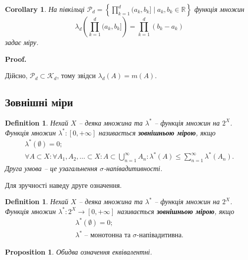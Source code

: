 \documentclass[a4paper, 10pt]{article}
\makeatletter
\theoremstyle{theoremdd}
\newtheorem{definition}[theorem]{Definition}
\newtheorem{proposition}[theorem]{Proposition}
\newtheorem{corollary}[theorem]{Corollary}
\renewenvironment{proof}[1][Proof.\\]{\par
\pushQED{\hfill \qed}%
\normalfont \topsep6\p@\@plus6\p@\relax
\trivlist
\item\relax
{\bfseries
#1\@addpunct{.}}\hspace\labelsep\ignorespaces
}{%
\popQED\endtrivlist\@endpefalse
}
\makeatother
\begin{document}
\begin{corollary}
На півкільці $\mathcal{P}_d = \displaystyle \left\{ \prod_{k=1}^d (a_k,b_k] \mid a_k,b_k \in \mathbb{R} \right\}$ функція множин
\begin{equation}
\lambda_d \left( \prod_{k=1}^d (a_k,b_k] \right) = \prod_{k=1}^d (b_k-a_k)
\end{equation} 
задає міру.
\end{corollary}

\begin{proof}
Дійсно, $\mathcal{P}_d \subset \mathcal{K}_d$, тому звідси $\lambda_d(A) = m(A)$.
\end{proof}

\subsection{Зовнішні міри}
\begin{definition}
Нехай $X$ -- деяка множина та $\lambda^*$ -- функція множин на $2^X$.\\
Функція множин $\lambda^* \colon [0,+\infty]$ називається \textbf{зовнішньою мірою}, якщо
\begin{align*}
\lambda^*(\emptyset) = 0; \\
\forall A \subset X: \forall A_1,A_2,\dots \subset X: A \subset \displaystyle\bigcup_{n=1}^\infty A_n: \lambda^*(A) \leq \sum_{n=1}^\infty \lambda^*(A_n).
\end{align*}
Друга умова -- це узагальнення $\sigma$-напівадитивності.
\end{definition}

\noindent
Для зручності наведу друге означення.
\begin{definition}
Нехай $X$ -- деяка множина та $\lambda^*$ -- функція множин на $2^X$.\\
Функція множин $\lambda^* \colon 2^X \to [0,+\infty]$ називається \textbf{зовнішньою мірою}, якщо
\begin{align*}
\lambda^*(\emptyset) = 0; \\
\lambda^* \text{ -- монотонна та $\sigma$-напівадитивна}.
\end{align*}
\end{definition}

\begin{proposition}
Обидва означення еквівалентні.
\end{proposition}
\end{document}
